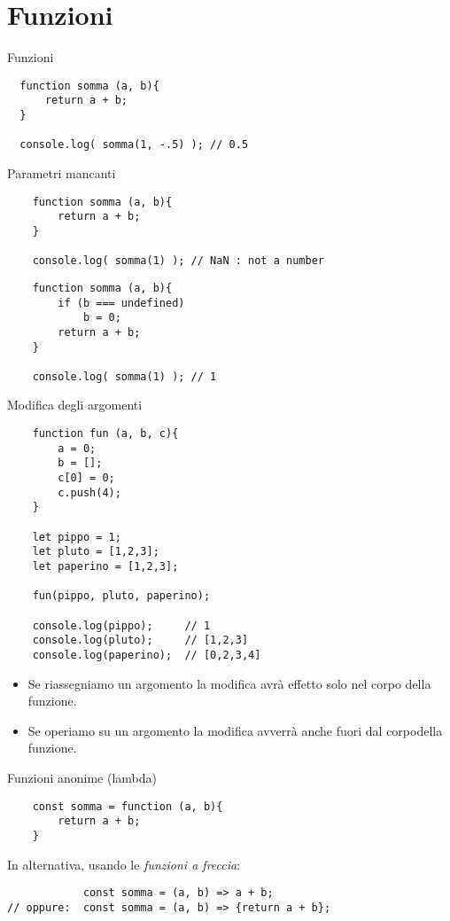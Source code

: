 \section{Funzioni}
\begin{frame}[fragile]{Funzioni}\transfade\centering
\begin{verbatim}
  function somma (a, b){
      return a + b;
  }

  console.log( somma(1, -.5) ); // 0.5
\end{verbatim}
\end{frame}

\begin{frame}[fragile]{Parametri mancanti}\transfade\centering
  \begin{verbatim}
    function somma (a, b){
        return a + b;
    }

    console.log( somma(1) ); // NaN : not a number
  \end{verbatim}
  \pause\bigskip
  \begin{verbatim}
    function somma (a, b){
        if (b === undefined)
            b = 0;
        return a + b;
    }

    console.log( somma(1) ); // 1
  \end{verbatim}
\end{frame}

\begin{frame}[fragile]{Modifica degli argomenti}\transfade\centering
  \begin{verbatim}
    function fun (a, b, c){
        a = 0;
        b = [];
        c[0] = 0;
        c.push(4);
    }

    let pippo = 1;
    let pluto = [1,2,3];
    let paperino = [1,2,3];

    fun(pippo, pluto, paperino);

    console.log(pippo);     // 1
    console.log(pluto);     // [1,2,3]
    console.log(paperino);  // [0,2,3,4]
  \end{verbatim}
  \bigskip
  \begin{itemize}
    \item Se riassegniamo un argomento la modifica avrà effetto solo nel corpo della funzione.
    \item Se operiamo su un argomento la modifica avverrà anche fuori dal corpodella funzione.
  \end{itemize}
\end{frame}

\begin{frame}[fragile]{Funzioni anonime (lambda)}\transfade\centering
  \begin{verbatim}
    const somma = function (a, b){
        return a + b;
    }
  \end{verbatim}
  \pause\bigskip
  In alternativa, usando le \emph{funzioni a freccia}:
  \begin{verbatim}
            const somma = (a, b) => a + b;
// oppure:  const somma = (a, b) => {return a + b};
\end{verbatim}
\end{frame}